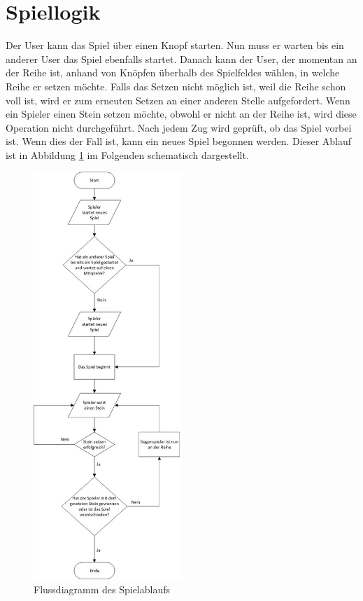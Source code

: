 \section{Spiellogik}\label{sec:Spiellogik}
Der User kann das Spiel über einen Knopf starten. Nun muss er warten bis ein anderer User das Spiel ebenfalls startet. Danach kann der User, der momentan an der Reihe ist, anhand von Knöpfen überhalb des Spielfeldes wählen, in welche Reihe er setzen möchte. Falls das Setzen nicht möglich ist, weil die Reihe schon voll ist, wird er zum erneuten Setzen an einer anderen Stelle aufgefordert. Wenn ein Spieler einen Stein setzen möchte, obwohl er nicht an der Reihe ist, wird diese Operation nicht durchgeführt. Nach jedem Zug wird geprüft, ob das Spiel vorbei ist. Wenn dies der Fall ist, kann ein neues Spiel begonnen werden. Dieser Ablauf ist in Abbildung \ref{fig:spiellogik} im Folgenden schematisch dargestellt.
\begin{figure}[H]
\centering
\includegraphics[width=0.5\textwidth]{images/spiellogik.jpg}
\caption{Flussdiagramm des Spielablaufs}
\label{fig:spiellogik}
\end{figure}

